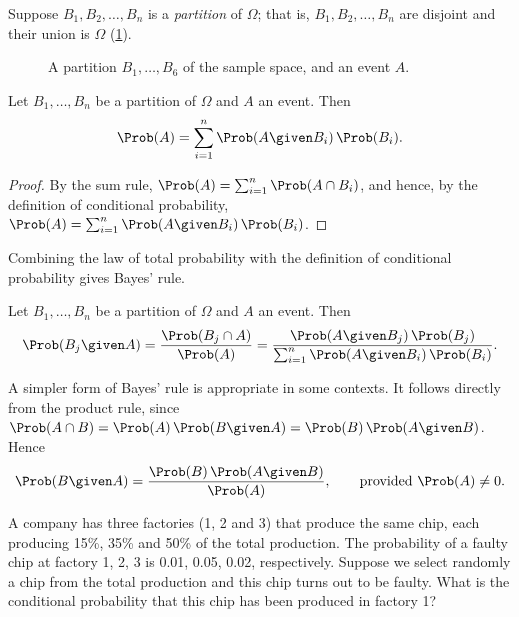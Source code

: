 Suppose $B_1, B_2, \ldots, B_n$ is a \emph{partition} of $\Omega$; that is, $B_1, B_2, \ldots, B_n$ are disjoint and their union is $\Omega$ (\cref{fig:partition}).

\begin{figure}[ht]
\centering
{}
\caption{A partition $B_1, \ldots, B_6$ of the sample space, and an event $A$.}
\label{fig:partition}
\end{figure}

\begin{theorem}\label{thm:total-probability}
Let $B_1, \ldots, B_n$ be a partition of $\Omega$ and $A$ an event. Then
\[
  \Prob(A) = \sum_{i=1}^n \Prob(A \given B_i)\,\Prob(B_i).
\]
\end{theorem}

\begin{proof}
By the sum rule, $\Prob(A) = \sum_{i=1}^n \Prob(A \cap B_i)$, and hence, by the definition of conditional probability, $\Prob(A) = \sum_{i=1}^n \Prob(A \given B_i)\,\Prob(B_i)$.
\end{proof}

Combining the law of total probability with the definition of conditional probability gives Bayes' rule.

\begin{theorem}\label{thm:bayes-rule}
Let $B_1, \ldots, B_n$ be a partition of $\Omega$ and $A$ an event. Then
\[
  \Prob(B_j \given A) = \frac{\Prob(B_j \cap A)}{\Prob(A)} = \frac{\Prob(A \given B_j)\,\Prob(B_j)}{\sum_{i=1}^n \Prob(A \given B_i)\,\Prob(B_i)}.
\]
\end{theorem}

A simpler form of Bayes' rule is appropriate in some contexts. It follows directly from the product rule, since $\Prob(A \cap B) = \Prob(A)\,\Prob(B \given A) = \Prob(B)\,\Prob(A \given B)$. Hence
\[
  \Prob(B \given A) = \frac{\Prob(B)\,\Prob(A \given B)}{\Prob(A)}, \qquad \text{provided } \Prob(A) \ne 0.
\]

\begin{example}\label{ex:three-factories}
A company has three factories (1, 2 and 3) that produce the same chip, each producing 15\%, 35\% and 50\% of the total production. The probability of a faulty chip at factory 1, 2, 3 is 0.01, 0.05, 0.02, respectively. Suppose we select randomly a chip from the total production and this chip turns out to be faulty. What is the conditional probability that this chip has been produced in factory 1?
\end{example}

